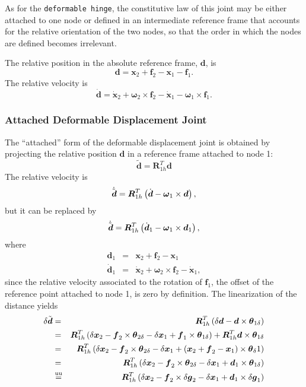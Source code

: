 \documentclass[10pt,dvips,fleqn]{report}
\newcommand{\T}[1]{\boldsymbol{#1}}
\newcommand{\equu}{\overset{\mathrm{uu}}{=}}
\begin{document}
As for the \texttt{deformable hinge}, the constitutive law of this joint
may be either attached to one node or defined in an intermediate
reference frame that accounts for the relative orientation of the two nodes,
so that the order in which the nodes are defined becomes irrelevant.

The relative position in the absolute reference frame, $\T{d}$, is
\begin{equation}
	\T{d} = \T{x}_2 + \T{f}_2 - \T{x}_1 - \T{f}_1 .
\end{equation}
The relative velocity is
\begin{equation}
	\dot{\T{d}} = \dot{\T{x}}_2 + \T{\omega}_2 \times \T{f}_2
		- \dot{\T{x}}_1 - \T{\omega}_1 \times \T{f}_1 .
\end{equation}

\subsubsection{Attached Deformable Displacement Joint}
The ``attached'' form of the deformable displacement joint
is obtained by projecting the relative position $\T{d}$
in a reference frame attached to node 1:
\begin{equation}
	\tilde{\T{d}} = \T{R}_{1h}^T \T{d}
\end{equation}
The relative velocity is
\begin{equation}
	\dot{\tilde{\T{d}}} = \T{R}_{1h}^T\plbr{
		\dot{\T{d}} - \T{\omega}_1 \times \T{d}
	} ,
\end{equation}
but it can be replaced by
\begin{equation}
	\dot{\tilde{\T{d}}} = \T{R}_{1h}^T\plbr{
		\dot{\T{d}}_1 - \T{\omega}_1 \times \T{d}_1
	} ,
\end{equation}
where
\begin{eqnarray*}
	\T{d}_1 & = & \T{x}_2 + \T{f}_2 - \T{x}_1 \\
	\dot{\T{d}}_1 & = & \dot{\T{x}}_2 + \T{\omega}_2 \times \T{f}_2 - \dot{\T{x}}_1 ,
\end{eqnarray*}
since the relative velocity associated to the rotation of $\T{f}_1$,
the offset of the reference point attached to node 1,
is zero by definition.
The linearization of the distance yields
\begin{eqnarray*}
	\delta{\tilde{\T{d}}} & = & \T{R}_{1h}^T\plbr{
		\delta\T{d} - \T{d} \times \T{\theta}_{1\delta}
	} \\
	& = & \T{R}_{1h}^T\plbr{
		\delta{\T{x}}_2 - \T{f}_2\times\T{\theta}_{2\delta}
		- \delta{\T{x}}_1 + \T{f}_1\times\T{\theta}_{1\delta}
	} + \T{R}_{1h}^T \T{d}\times\T{\theta}_{1\delta} \\
	& = & \T{R}_{1h}^T\plbr{
		\delta{\T{x}}_2
		- \T{f}_2\times\T{\theta}_{2\delta}
		- \delta{\T{x}}_1
		+ \plbr{
			\T{x}_2
			+ \T{f}_2
			- \T{x}_1
		}\times\T{\theta}_{\delta}1
	} \\
	& = & \T{R}_{1h}^T\plbr{
		\delta{\T{x}}_2
		- \T{f}_2\times\T{\theta}_{2\delta}
		- \delta{\T{x}}_1
		+ \T{d}_1\times\T{\theta}_{1\delta}
	} \\
	& \equu & \T{R}_{1h}^T\plbr{
		\delta{\T{x}}_2
		- \T{f}_2\times\delta\T{g}_2
		- \delta{\T{x}}_1
		+ \T{d}_1\times\delta\T{g}_1
	}
\end{eqnarray*}
\end{document}
